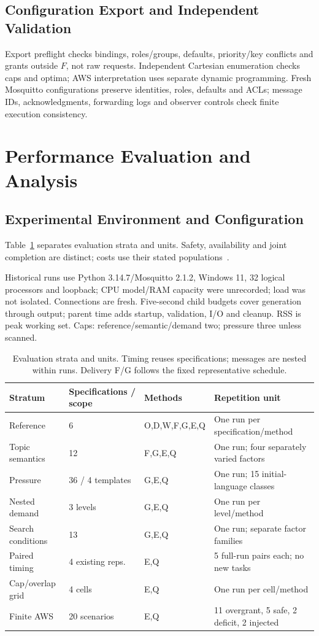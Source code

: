 \documentclass[letterpaper,journal]{IEEEtran}
\begin{document}
\subsection{Configuration Export and Independent Validation}
Export preflight checks bindings, roles/groups, defaults, priority/key conflicts and grants outside $F$, not raw requests. Independent Cartesian enumeration checks caps and optima; AWS interpretation uses separate dynamic programming. Fresh Mosquitto configurations preserve identities, roles, defaults and ACLs; message IDs, acknowledgments, forwarding logs and observer controls check finite execution consistency.



\section{Performance Evaluation and Analysis}\label{sec:eval}
\subsection{Experimental Environment and Configuration}
Table~\ref{tab:design} separates evaluation strata and units. Safety, availability and joint completion are distinct; costs use their stated populations~\cite{iam_metrics}.

Historical runs use Python 3.14.7/Mosquitto 2.1.2, Windows 11, 32 logical processors and loopback; CPU model/RAM capacity were unrecorded; load was not isolated. Connections are fresh. Five-second child budgets cover generation through output; parent time adds startup, validation, I/O and cleanup. RSS is peak working set. Caps: reference/semantic/demand two; pressure three unless scanned.

\begin{table}[!t]\centering\small
\caption{Evaluation strata and units. Timing reuses specifications; messages are nested within runs. Delivery F/G follows the fixed representative schedule.}\label{tab:design}
\begin{tabularx}{\textwidth}{@{}p{29mm}p{31mm}p{30mm}X@{}}\toprule
Stratum & Specifications / scope & Methods & Repetition unit\\\midrule
Reference & 6 & O,D,W,F,G,E,Q & One run per specification/method\\
Topic semantics & 12 & F,G,E,Q & One run; four separately varied factors\\
Pressure & 36 / 4 templates & G,E,Q & One run; 15 initial-language classes\\
Nested demand & 3 levels & G,E,Q & One run per level/method\\
Search conditions & 13 & G,E,Q & One run; separate factor families\\
Paired timing & 4 existing reps. & E,Q & 5 full-run pairs each; no new tasks\\
Cap/overlap grid & 4 cells & E,Q & One run per cell/method\\
Finite AWS & 20 scenarios & E,Q & 11 overgrant, 5 safe, 2 deficit, 2 injected\\
\bottomrule\end{tabularx}\end{table}
\end{document}
